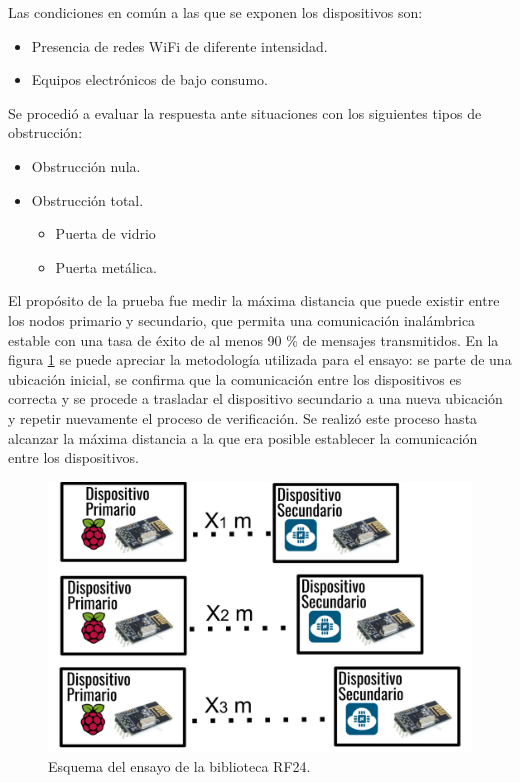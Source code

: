 Las condiciones en común a las que se exponen los dispositivos son: 
\begin{itemize}
\item Presencia de redes WiFi de diferente intensidad.
\item Equipos electrónicos de bajo consumo.
\end{itemize}

Se procedió a evaluar la respuesta ante situaciones con los siguientes tipos de obstrucción:  
\begin{itemize}
\item Obstrucción nula.
\item Obstrucción total.
	\begin{itemize}
	\item  Puerta de vidrio
	\item  Puerta metálica.
	\end{itemize} 
\end{itemize}  

El propósito de la prueba fue medir la máxima distancia que puede existir entre los nodos primario y secundario, que permita una comunicación inalámbrica estable con una tasa de éxito de al menos 90 \% de mensajes transmitidos. En la figura \ref{fig:figura_c} se puede apreciar la metodología utilizada para el ensayo: se parte de una ubicación inicial, se confirma que la comunicación entre los dispositivos es correcta y se procede a trasladar el dispositivo secundario a una nueva ubicación y repetir nuevamente el proceso de verificación. Se realizó este proceso hasta alcanzar la máxima distancia a la que era posible establecer la comunicación entre los dispositivos. 

\begin{figure}[ht]
	\centering
	\includegraphics[scale=.3]{./Figures/Capitulo4/Figura_C.png}
	\caption{Esquema del ensayo de la biblioteca RF24.}
	\label{fig:figura_c}
\end{figure}

